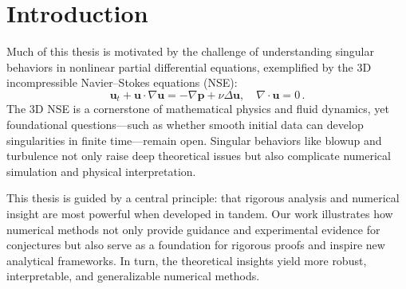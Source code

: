 \documentclass[12pt]{caltech_thesis}
\numberwithin{equation}{section}
\begin{document}
\begin{abstract}
  
  Chapter \ref{chap:4} introduces Exponential Multiscale Finite Element Method (ExpMsFEM), developed to efficiently solve challenging multiscale PDEs beyond elliptic problems, such as the Helmholtz equation.  We construct adaptive local bases, proving exponential convergence theoretically and demonstrating superior computational performance in practice. Like KAN, ExpMsFEM exemplifies how insights from theory can guide the design of high-performance solvers with theoretical guarantees.
\end{abstract}

\begin{publishedcontent}[iknowwhattodo]
\nocite{hou2024blowup,hou20242,chen2024stability,liu2025finite,kan1,liu2024kan,kanbias,chen2024exponentially,chen2023exponentially,chen2021exponential,liu2022second,maust2022fourier,li2024scale,wang2025high,hou2025nonuniqueness,rigas2025initialization,lee2025kano}
\end{publishedcontent}

\tableofcontents
\listoffigures
\printnomenclature

\mainmatter

\chapter{Introduction}
Much of this thesis is motivated by the challenge of understanding singular behaviors in nonlinear partial differential equations, exemplified by the 3D incompressible Navier–Stokes equations (NSE):
\begin{equation}\label{NSE}
\mathbf{u}_{t}+\mathbf{u} \cdot \nabla \mathbf{u}=-\nabla \mathbf{p}+\nu \Delta \mathbf{u}, \quad \nabla \cdot \mathbf{u}=0\,.
\end{equation}
The 3D NSE is a cornerstone of mathematical physics and fluid dynamics, yet foundational questions—such as whether smooth initial data can develop singularities in finite time—remain open. Singular behaviors like blowup and turbulence not only raise deep theoretical issues but also complicate numerical simulation and physical interpretation.

This thesis is guided by a central principle: that rigorous analysis and numerical insight are most powerful when developed in tandem. Our work illustrates how numerical methods not only provide guidance and experimental evidence for conjectures but also serve as a foundation for rigorous proofs and inspire new analytical frameworks. In turn, the theoretical insights yield more robust, interpretable, and generalizable numerical methods.
\end{document}
